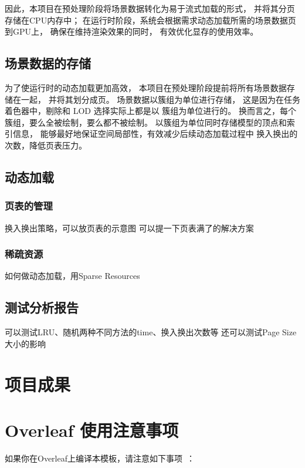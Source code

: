 因此，本项目在预处理阶段将场景数据转化为易于流式加载的形式，
并将其分页存储在CPU内存中；
在运行时阶段，系统会根据需求动态加载所需的场景数据页到GPU上，
确保在维持渲染效果的同时，
有效优化显存的使用效率。

\subsection{场景数据的存储}

为了使运行时的动态加载更加高效，
本项目在预处理阶段提前将所有场景数据存储在一起，
并将其划分成页。
场景数据以簇组为单位进行存储，
这是因为在任务着色器中，剔除和 LOD 选择实际上都是以
簇组为单位进行的。
换而言之，每个簇组，要么全被绘制，要么都不被绘制。
以簇组为单位同时存储模型的顶点和索引信息，
能够最好地保证空间局部性，有效减少后续动态加载过程中
换入换出的次数，降低页表压力。

\subsection{动态加载}

\subsubsection{页表的管理}

换入换出策略，可以放页表的示意图
可以提一下页表满了的解决方案

\subsubsection{稀疏资源}

如何做动态加载，用Sparse Resources

\subsection{测试分析报告}

可以测试LRU、随机两种不同方法的time、换入换出次数等
还可以测试Page Size大小的影响

\section{项目成果}

\section{Overleaf 使用注意事项}

如果你在Overleaf上编译本模板，请注意如下事项~\cite{zjuthesis}：

